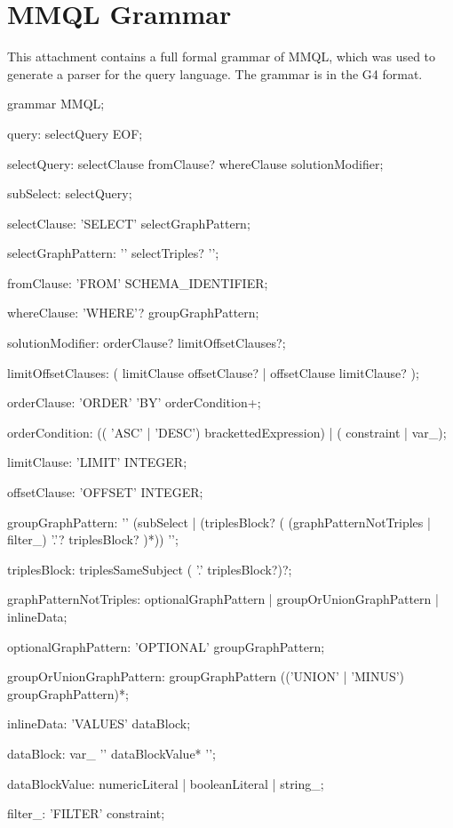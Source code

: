 \section{MMQL Grammar}
\label{attachment:grammar}

This attachment contains a full formal grammar of MMQL, which was used to generate a parser for the query language.
The grammar is in the G4 format.

\begin{code}
grammar MMQL;

query: selectQuery EOF;

selectQuery: selectClause fromClause? whereClause solutionModifier;

subSelect: selectQuery;

selectClause: 'SELECT' selectGraphPattern;

selectGraphPattern: '{' selectTriples? '}';

fromClause: 'FROM' SCHEMA_IDENTIFIER;

whereClause: 'WHERE'? groupGraphPattern;

solutionModifier: orderClause? limitOffsetClauses?;

limitOffsetClauses: (
		limitClause offsetClause?
		| offsetClause limitClause?
	);

orderClause: 'ORDER' 'BY' orderCondition+;

orderCondition: (( 'ASC' | 'DESC') brackettedExpression)
	| ( constraint | var_);

limitClause: 'LIMIT' INTEGER;

offsetClause: 'OFFSET' INTEGER;

groupGraphPattern:
	'{' (subSelect | (triplesBlock? (
		(graphPatternNotTriples | filter_) '.'? triplesBlock?
	)*)) '}';

triplesBlock: triplesSameSubject ( '.' triplesBlock?)?;

graphPatternNotTriples:
	optionalGraphPattern
	| groupOrUnionGraphPattern
	| inlineData;

optionalGraphPattern: 'OPTIONAL' groupGraphPattern;

groupOrUnionGraphPattern:
	groupGraphPattern (('UNION' | 'MINUS') groupGraphPattern)*;

inlineData: 'VALUES' dataBlock;

dataBlock: var_ '{' dataBlockValue* '}';

dataBlockValue: numericLiteral
	| booleanLiteral
	| string_;

filter_: 'FILTER' constraint;


\end{code}
